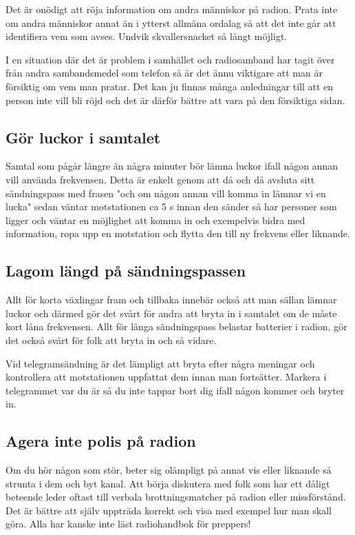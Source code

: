 Det är onödigt att röja information om andra människor på radion. Prata inte om andra människor annat än i ytterst allmäna ordalag så att det inte går att identifiera vem som avses. Undvik skvallersnacket så långt möjligt.

I en situation där det är problem i samhället och radiosamband har tagit över från andra sambandsmedel som telefon så är det ännu viktigare att man är försiktig om vem man pratar. Det kan ju finnas många anledningar till att en person inte vill bli röjd och det är därför bättre att vara på den försiktiga sidan.

\subsection{Gör luckor i samtalet}

Samtal som pågår längre än några minuter bör lämna luckor ifall någon annan vill använda frekvensen. Detta är enkelt genom att då och då avsluta sitt sändningspass med frasen "och om någon annan vill komma in lämnar vi en lucka" sedan väntar motstationen ca 5 s innan den sänder så har personer som ligger och väntar en möjlighet att komma in och exempelvis bidra med information, ropa upp en motstation och flytta den till ny frekvens eller liknande.

\subsection{Lagom längd på sändningspassen}

Allt för korta växlingar fram och tillbaka innebär också att man sällan lämnar luckor och därmed gör det svårt för andra att bryta in i samtalet om de måste kort låna frekvensen. Allt för långa sändningspass belastar batterier i radion, gör det också svårt för folk att bryta in och så vidare.

Vid telegramsändning är det lämpligt att bryta efter några meningar och kontrollera att motstationen uppfattat dem innan man fortsätter. Markera i telegrammet var du är så du inte tappar bort dig ifall någon kommer och bryter in.

\subsection{Agera inte polis på radion}

Om du hör någon som stör, beter sig olämpligt på annat vis eller liknande så strunta i dem och byt kanal. Att börja diskutera  med folk som har ett dåligt beteende leder oftast till verbala brottningsmatcher på radion eller missförstånd. Det är bättre att själv uppträda korrekt och visa med exempel hur man skall göra. Alla har kanske inte läst radiohandbok för preppers!

















